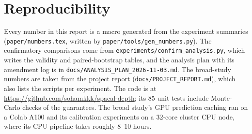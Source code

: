 \section{Reproducibility}
\label{app:repro}
Every number in this report is a macro generated from the experiment summaries (\texttt{paper/numbers.tex}, written by \texttt{paper/tools/gen\_numbers.py}).
The confirmatory comparisons come from \texttt{experiments/confirm\_analysis.py}, which writes the validity and paired-bootstrap tables, and the analysis plan with its amendment log is in \texttt{docs/ANALYSIS\_PLAN\_2026-11-03.md}.
The broad-study numbers are taken from the project report (\texttt{docs/PROJECT\_REPORT.md}), which also lists the scripts per experiment.
The code is at \url{https://github.com/sohamkkk/spacal-depth}; its 85 unit tests include Monte-Carlo checks of the guarantees.
The broad study's GPU prediction caching ran on a Colab A100 and its calibration experiments on a 32-core cluster CPU node, where its CPU pipeline takes roughly 8--10 hours.
